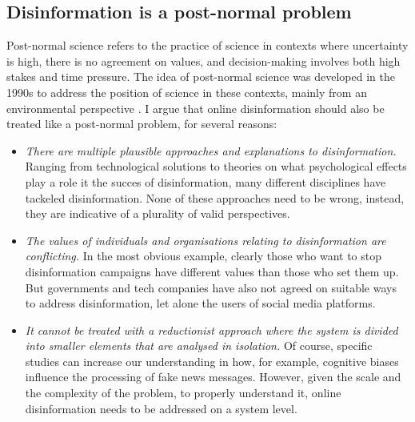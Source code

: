 \subsection{Disinformation is a post-normal problem}
Post-normal science refers to the practice of science in contexts where uncertainty is high, there is no agreement on values, and decision-making involves both high stakes and time pressure. The idea of post-normal science was developed in the 1990s to address the position of science in these contexts, mainly from an environmental perspective \cite{funtowicz1995science, Ravetz1999}. %
I argue that online disinformation should also be treated like a post-normal problem, for several reasons:
\begin{itemize}
	\item \textit{There are multiple plausible approaches and explanations to disinformation.} Ranging from technological solutions to theories on what psychological effects play a role it the succes of disinformation, many different disciplines have tackeled disinformation. None of these approaches need to be wrong, instead, they are indicative of a plurality of valid perspectives.
	\item \textit{The values of individuals and organisations relating to disinformation are conflicting.} In the most obvious example, clearly those who want to stop disinformation campaigns have different values than those who set them up. But governments and tech companies have also not agreed on suitable ways to address disinformation, let alone the users of social media platforms.
	\item \textit{It cannot be treated with a reductionist approach where the system is divided into smaller elements that are analysed in isolation.} Of course, specific studies can increase our understanding in how, for example, cognitive biases influence the processing of fake news messages. However, given the scale and the complexity of the problem, to properly understand it, online disinformation needs to be addressed on a system level.

\end{itemize}
 

